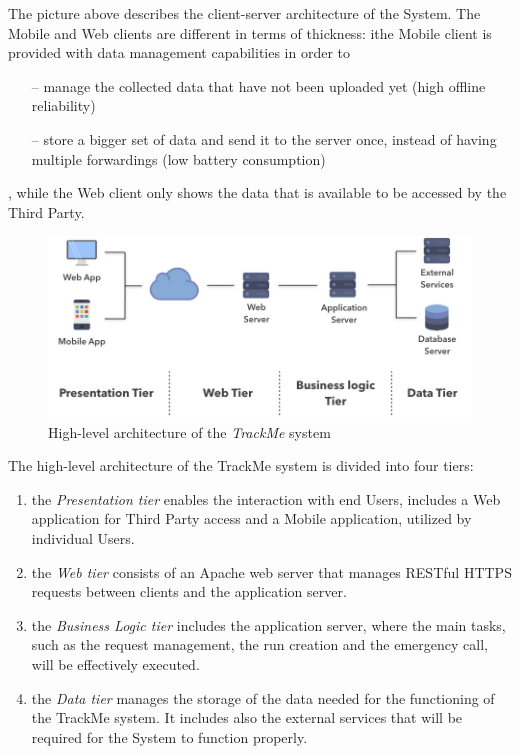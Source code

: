 \newpage

The picture above describes the client-server architecture of the System. The Mobile and Web clients are different in terms of thickness: ithe Mobile client is provided with data management capabilities in order to 
\begin{itemize}
	\item[--] manage the collected data that have not been uploaded yet (high offline reliability)
	\item[--] store a bigger set of data and send it to the server once, instead of having multiple forwardings (low battery consumption) 
\end{itemize}
, while the Web client only shows the data that is available to be accessed by the Third Party. 


\vspace{5mm}

\begin{figure}[H]

\includegraphics[scale=0.43,keepaspectratio]{./Pictures/high-level-basic.jpeg}
\centering
\caption{High-level architecture of the \textit{TrackMe} system}

\end{figure}

\vspace{5mm}

The high-level architecture of the TrackMe system is divided into four tiers:
\begin{enumerate}
\item the \textit{Presentation tier} enables the interaction with end Users, includes a Web application for Third Party access and a Mobile application, utilized by individual Users.
\item the \textit{Web tier} consists of an Apache web server that manages RESTful HTTPS requests between clients and the application server.
\item the \textit{Business Logic tier} includes the application server, where the main tasks, such as the request management, the run creation and the emergency call, will be effectively executed. 
\item the \textit{Data tier} manages the storage of the data needed for the functioning of the TrackMe system. It includes also the external services that will be required for the System to function properly.
\end{enumerate}

\newpage